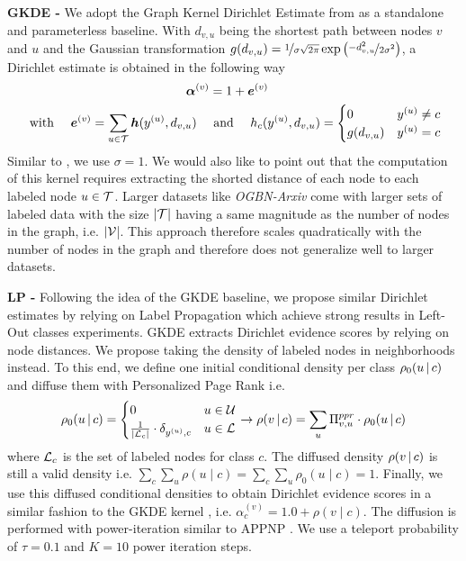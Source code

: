 \textbf{GKDE - } We adopt the Graph Kernel Dirichlet Estimate from \citep{Zhao2020} as a standalone and parameterless baseline. With $d_{v,u}$ being the shortest path between nodes $v$ and $u$ and the Gaussian 
transformation $g(d_{v,u}) = \nicefrac{1}{\sigma \sqrt{2\pi}} \exp \left(\nicefrac{-d_{v,u}^2}{2\sigma^2}\right)$, a Dirichlet estimate is obtained in the following way
\begin{align*}
    \bm{\alpha}^{(v)} &= 1 + \bm{e}^{(v)} \\
    \text{ with } \quad \bm{e}^{(v)} = \sum_{u \in \mathcal{T}} \bm{h}(y^{(u)}, d_{v,u}) \quad &\text{ and } \quad h_c(y^{(u)}, d_{v,u}) = \begin{cases}0 & y^{(u)} \neq c\\ g(d_{v,u}) &  y^{(u)} = c \end{cases}
\end{align*}
Similar to \citep{Zhan2020}, we use $\sigma=1$. We would also like to point out that the computation of this kernel requires extracting the shorted distance of each node to each labeled node $u \in \mathcal{T}$. Larger datasets like \emph{OGBN-Arxiv} come with larger sets of labeled data with the size $|\mathcal{T}|$ having a same magnitude as the number of nodes in the graph, i.e. $|\mathcal{V}$|. This approach therefore scales quadratically with the number of nodes in the graph and therefore does not generalize well to larger datasets. 

\textbf{LP - } Following the idea of the GKDE baseline, we propose similar Dirichlet estimates by relying on Label Propagation which achieve strong results in Left-Out classes experiments. GKDE extracts Dirichlet evidence scores by relying on node distances. We propose taking the density of labeled nodes in neighborhoods instead. To this end, we define one initial conditional density per class $\rho_0(u \,|\, c)$ and diffuse them with Personalized Page Rank i.e.
\begin{align*}
\rho_0(u \,|\, c) = 
\begin{cases}
0 & u \in \mathcal{U} \\
\frac{1}{|\mathcal{L}_c|} \cdot \delta_{y^{(u)}, c} & u \in \mathcal{L}
\end{cases} \rightarrow \rho(v \,|\, c) = \sum_u \Pi^{ppr}_{v, u}\cdot \rho_0(u \,|\, c)
\end{align*}
where $\mathcal{L}_c$ is the set of labeled nodes for class $c$. The diffused density $\rho(v \,|\, c)$ is still a valid density i.e. $\sum_c \sum_u \rho(u\mid c) = \sum_c \sum_u \rho_0(u\mid c) = 1$. Finally, we use this diffused conditional densities to obtain Dirichlet evidence scores in a similar fashion to the GKDE kernel \citep{Zhao2020}, i.e. $\alpha_c^{(v)} = 1.0 + \rho(v\mid c)$. The diffusion is performed with power-iteration similar to APPNP \citep{Klicpera2018}. We use a teleport probability of $\tau=0.1$ and $K=10$ power iteration steps.

